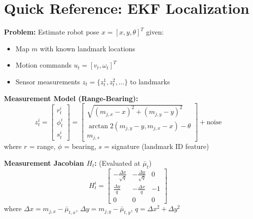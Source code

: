 
\section{Quick Reference: EKF Localization}

\begin{tcolorbox}[colback=yellow!10!white,colframe=orange!75!black,title=\textbf{EKF Localization - Fast Reference}]

\textbf{Problem:} Estimate robot pose $x = [x, y, \theta]^T$ given:
\begin{itemize}
    \item Map $m$ with known landmark locations
    \item Motion commands $u_t = [v_t, \omega_t]^T$
    \item Sensor measurements $z_t = \{z_t^1, z_t^2, \ldots\}$ to landmarks
\end{itemize}

\vspace{3mm}
\textbf{Measurement Model (Range-Bearing):}
\begin{equation*}
z_t^i = \begin{bmatrix} r_t^i \\ \phi_t^i \\ s_t^i \end{bmatrix} = 
\begin{bmatrix} 
\sqrt{(m_{j,x} - x)^2 + (m_{j,y} - y)^2} \\ 
\arctan2(m_{j,y} - y, m_{j,x} - x) - \theta \\ 
m_{j,s} 
\end{bmatrix} + \text{noise}
\end{equation*}
where $r$ = range, $\phi$ = bearing, $s$ = signature (landmark ID feature)

\vspace{3mm}
\textbf{Measurement Jacobian $H_t$:} (Evaluated at $\bar{\mu}_t$)
\begin{equation*}
H_t^i = \begin{bmatrix} 
-\frac{\Delta x}{\sqrt{q}} & -\frac{\Delta y}{\sqrt{q}} & 0 \\[3pt]
\frac{\Delta y}{q} & -\frac{\Delta x}{q} & -1 \\[3pt]
0 & 0 & 0 
\end{bmatrix}
\end{equation*}
where $\Delta x = m_{j,x} - \bar{\mu}_{t,x}$, $\Delta y = m_{j,y} - \bar{\mu}_{t,y}$, $q = \Delta x^2 + \Delta y^2$


\end{tcolorbox}
